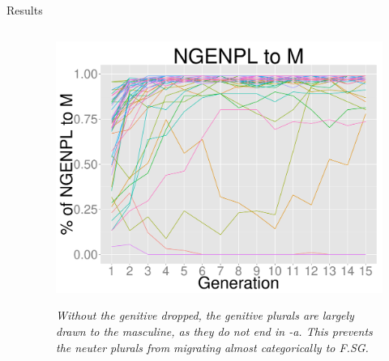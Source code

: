 \documentclass[final]{beamer}
\newlength{\twocolwid}
\begin{document}
\begin{frame}[t]
\begin{columns}[t]
\begin{column}{\twocolwid}
\begin{block}{Results}
\begin{columns}[t]
\begin{column}{.33\linewidth}
      \end{column}      
       \begin{column}{.33\linewidth}
\footnotesize
\begin{figure}
\begin{center} 
\vspace{2cm}
{\centering \includegraphics[width=1\textwidth]{ngenpltom.pdf}}
\end{center}
\caption{\textit{Without the genitive dropped, the genitive plurals are largely drawn to the masculine, as they do {\sl not} end in {\sl -a}. This prevents the neuter plurals from migrating almost categorically to F.SG.}}
\end{figure}           
       
      \end{column}    
    \end{columns}
    

\end{block}
\end{column}
\end{columns}
\end{frame}
\end{document}
